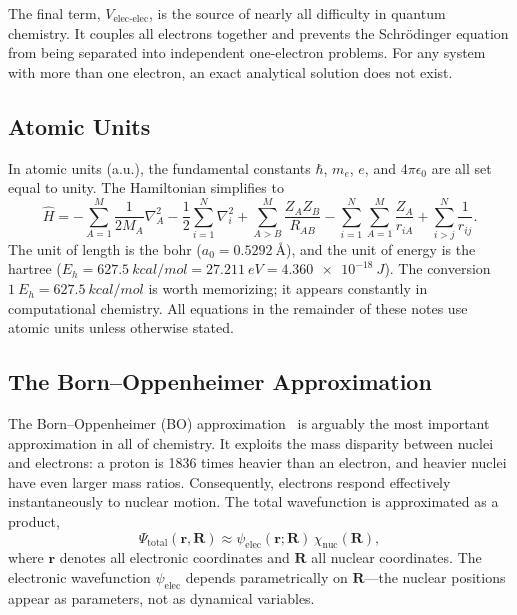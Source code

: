 \documentclass[11pt]{article}
\numberwithin{equation}{section}
\begin{document}
The final term, $V_\text{elec-elec}$, is the source of nearly all difficulty in quantum chemistry. It couples all electrons together and prevents the Schr\"{o}dinger equation from being separated into independent one-electron problems. For any system with more than one electron, an exact analytical solution does not exist.

\subsection{Atomic Units}

In atomic units (a.u.), the fundamental constants $\hbar$, $m_e$, $e$, and $4\pi\epsilon_0$ are all set equal to unity. The Hamiltonian simplifies to
\begin{equation}
\hat{H} = -\sum_{A=1}^{M}\frac{1}{2M_A}\nabla_A^2 - \frac{1}{2}\sum_{i=1}^{N}\nabla_i^2 + \sum_{A>B}^{M}\frac{Z_A Z_B}{R_{AB}} - \sum_{i=1}^{N}\sum_{A=1}^{M}\frac{Z_A}{r_{iA}} + \sum_{i>j}^{N}\frac{1}{r_{ij}}.
\label{eq:hamiltonian_au}
\end{equation}
The unit of length is the bohr ($a_0 = \SI{0.5292}{\angstrom}$), and the unit of energy is the hartree ($E_h = \SI{627.5}{kcal/mol} = \SI{27.211}{eV} = \SI{4.360e-18}{J}$). The conversion $\SI{1}{E_h} = \SI{627.5}{kcal/mol}$ is worth memorizing; it appears constantly in computational chemistry. All equations in the remainder of these notes use atomic units unless otherwise stated.

\subsection{The Born--Oppenheimer Approximation}
\label{sec:BO}

The Born--Oppenheimer (BO) approximation~\cite{BornOppenheimer1927} is arguably the most important approximation in all of chemistry. It exploits the mass disparity between nuclei and electrons: a proton is 1836 times heavier than an electron, and heavier nuclei have even larger mass ratios. Consequently, electrons respond effectively instantaneously to nuclear motion. The total wavefunction is approximated as a product,
\begin{equation}
\Psi_\text{total}(\mathbf{r}, \mathbf{R}) \approx \psi_\text{elec}(\mathbf{r}; \mathbf{R})\,\chi_\text{nuc}(\mathbf{R}),
\label{eq:BO}
\end{equation}
where $\mathbf{r}$ denotes all electronic coordinates and $\mathbf{R}$ all nuclear coordinates. The electronic wavefunction $\psi_\text{elec}$ depends parametrically on $\mathbf{R}$---the nuclear positions appear as parameters, not as dynamical variables.
\end{document}
